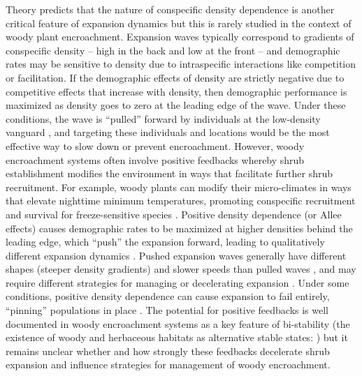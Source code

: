 \documentclass[11pt]{article}\usepackage[]{graphicx}\usepackage[usenames,dvipsnames]{xcolor}
\begin{document}
Theory predicts that the nature of conspecific density dependence is another critical feature of expansion dynamics but this is rarely studied in the context of woody plant encroachment.  
Expansion waves typically correspond to gradients of conspecific density -- high in the back and low at the front -- and demographic rates may be sensitive to density due to intraspecific interactions like competition or facilitation.
If the demographic effects of density are strictly negative due to competitive effects that increase with density, then demographic performance is maximized as density goes to zero at the leading edge of the wave. 
Under these conditions, the wave is ``pulled'' forward by individuals at the low-density vanguard \citep{kot1996dispersal}, and targeting these individuals and locations would be the most effective way to slow down or prevent encroachment. 
However, woody encroachment systems often involve positive feedbacks whereby shrub establishment modifies the environment in ways that facilitate further shrub recruitment. 
For example, woody plants can modify their micro-climates in ways that elevate nighttime minimum temperatures, promoting conspecific recruitment and survival for freeze-sensitive species \citep{d2013vegetation,huang2020critical}. 
Positive density dependence (or Allee effects) causes demographic rates to be maximized at higher densities behind the leading edge, which ``push'' the expansion forward, leading to qualitatively different expansion dynamics \citep{kot1996dispersal, taylor2005allee, sullivan2017density, lewis1993allee, veit1996dispersal}.
Pushed expansion waves generally have different shapes (steeper density gradients) and slower speeds than pulled waves \citep{gandhi2016range}, and may require different strategies for managing or decelerating expansion \citep{taylor2005allee}. 
Under some conditions, positive density dependence can cause expansion to fail entirely, ``pinning'' populations in place \citep{keitt2001allee}. 
The potential for positive feedbacks is well documented in woody encroachment systems as a key feature of bi-stability (the existence of woody and herbaceous habitats as alternative stable states: \cite{wilcox2018emerging}) but it remains unclear whether and how strongly these feedbacks decelerate shrub expansion and influence strategies for management of woody encroachment.
\end{document}
